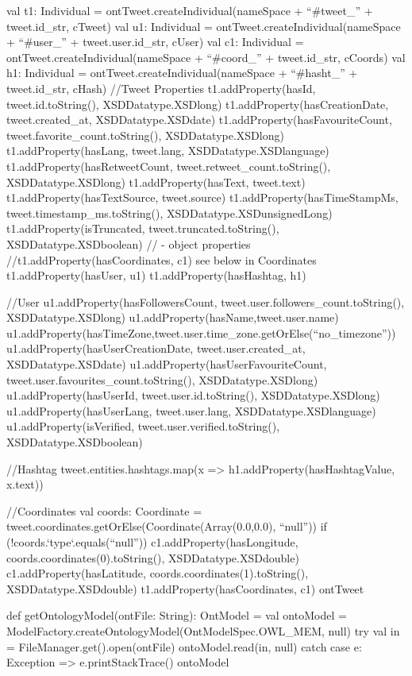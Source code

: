 \begin{listing}[
  language = scala,
  numbers=left,
  numberstyle=\tiny,
  stepnumber=5,
  numbersep=5pt,
  frame=single,
  caption  = {ms.semtweet: transformación a triplas},
  label    = code:ms.semtweet]
{{    val t1: Individual = ontTweet.createIndividual(nameSpace + ``#tweet_'' + tweet.id_str, cTweet)
    val u1: Individual = ontTweet.createIndividual(nameSpace + ``#user_'' + tweet.user.id_str, cUser)
    val c1: Individual = ontTweet.createIndividual(nameSpace + ``#coord_'' + tweet.id_str, cCoords)
    val h1: Individual = ontTweet.createIndividual(nameSpace + ``#hasht_'' + tweet.id_str, cHash)
    //Tweet Properties
    t1.addProperty(hasId, tweet.id.toString(), XSDDatatype.XSDlong)
    t1.addProperty(hasCreationDate, tweet.created_at, XSDDatatype.XSDdate)
    t1.addProperty(hasFavouriteCount, tweet.favorite_count.toString(), XSDDatatype.XSDlong)
    t1.addProperty(hasLang, tweet.lang, XSDDatatype.XSDlanguage)
    t1.addProperty(hasRetweetCount, tweet.retweet_count.toString(), XSDDatatype.XSDlong)
    t1.addProperty(hasText, tweet.text)
    t1.addProperty(hasTextSource, tweet.source)
    t1.addProperty(hasTimeStampMs, tweet.timestamp_ms.toString(), XSDDatatype.XSDunsignedLong)
    t1.addProperty(isTruncated, tweet.truncated.toString(), XSDDatatype.XSDboolean)
    // - object properties
    //t1.addProperty(hasCoordinates, c1) see below in Coordinates
    t1.addProperty(hasUser, u1)
    t1.addProperty(hasHashtag, h1)

    //User
    u1.addProperty(hasFollowersCount, tweet.user.followers_count.toString(), XSDDatatype.XSDlong)
    u1.addProperty(hasName,tweet.user.name)
    u1.addProperty(hasTimeZone,tweet.user.time_zone.getOrElse(``no_timezone''))
    u1.addProperty(hasUserCreationDate, tweet.user.created_at, XSDDatatype.XSDdate)
    u1.addProperty(hasUserFavouriteCount, tweet.user.favourites_count.toString(), XSDDatatype.XSDlong)
    u1.addProperty(hasUserId, tweet.user.id.toString(), XSDDatatype.XSDlong)
    u1.addProperty(hasUserLang, tweet.user.lang, XSDDatatype.XSDlanguage)
    u1.addProperty(isVerified, tweet.user.verified.toString(), XSDDatatype.XSDboolean)

    //Hashtag
    tweet.entities.hashtags.map(x => h1.addProperty(hasHashtagValue, x.text))

    //Coordinates
    val coords: Coordinate = tweet.coordinates.getOrElse(Coordinate(Array(0.0,0.0), ``null''))
    if (!coords.`type`.equals(``null'')){
      c1.addProperty(hasLongitude, coords.coordinates(0).toString(), XSDDatatype.XSDdouble)
      c1.addProperty(hasLatitude, coords.coordinates(1).toString(), XSDDatatype.XSDdouble)
      t1.addProperty(hasCoordinates, c1)
    }
    ontTweet
  }


  def getOntologyModel(ontFile: String): OntModel = {
    val ontoModel = ModelFactory.createOntologyModel(OntModelSpec.OWL_MEM, null)
    try{
      val in = FileManager.get().open(ontFile)
      ontoModel.read(in, null)
    }
    catch {
      case e: Exception => e.printStackTrace()
    }
    ontoModel
  }
}
\end{listing}
